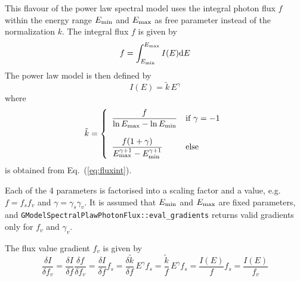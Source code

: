 \documentclass{article}[12pt,a4]
\begin{document}
This flavour of the power law spectral model uses the integral photon flux $f$ within the
energy range $E_{\rm min}$ and $E_{\rm max}$ as free parameter instead of
the normalization $k$.
The integral flux $f$ is given by
\begin{equation}
f = \int_{E_{\rm min}}^{E_{\rm max}} I(E) {\rm d}E
\label{eq:fluxint}
\end{equation}
The power law model is then defined by
\begin{equation}
I(E) = \tilde{k} \, E^{\gamma}
\end{equation}
where
\begin{equation}
   \tilde{k} = \left \{
   \begin{array}{l l}
      \displaystyle
      \frac{f}{\ln E_{\rm max} - \ln E_{\rm min}} 
        & \mbox{if $\gamma = -1$} \\
     \\
     \displaystyle
      \frac{f (1+\gamma)}{E_{\rm max}^{\gamma+1}-E_{\rm min}^{\gamma+1}} 
        & \mbox{else}
   \end{array}
   \right .
\end{equation}
is obtained from Eq.~(\ref{eq:fluxint}).

Each of the 4 parameters is factorised into a scaling factor and a value, e.g.
$f=f_s f_v$ and $\gamma=\gamma_s \gamma_v$.
It is assumed that $E_{\rm min}$ and $E_{\rm max}$ are fixed parameters,
and {\tt GModelSpectralPlawPhotonFlux::eval\_gradients} returns valid gradients only for 
$f_v$ and $\gamma_v$.

The flux value gradient $f_v$ is given by
\begin{equation}
\frac{\delta I}{\delta f_v} = 
  \frac{\delta I}{\delta f} \frac{\delta f}{\delta f_v} = 
  \frac{\delta I}{\delta f} f_s = 
  \frac{\delta \tilde{k}}{\delta f} \, E^{\gamma} f_s = 
  \frac{\tilde{k}}{f} \, E^{\gamma} f_s = 
  \frac{I(E)}{f} f_s =
  \frac{I(E)}{f_v}
\end{equation}
\end{document}
